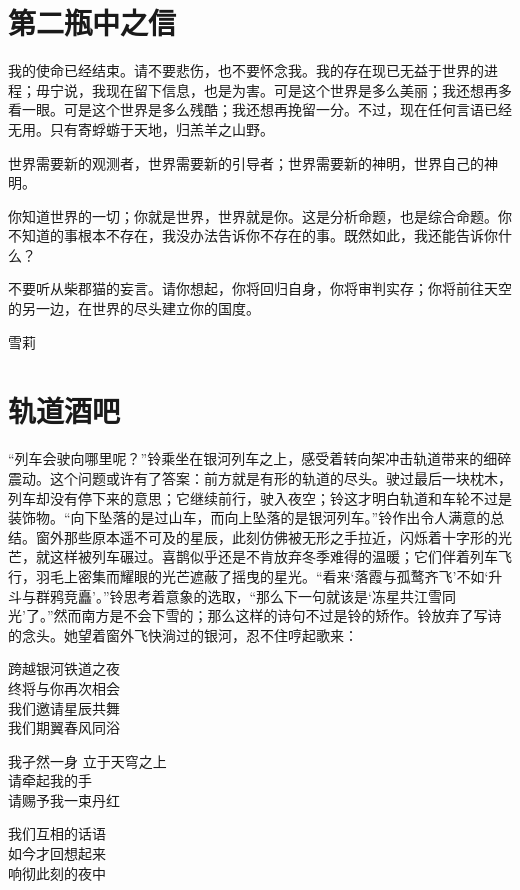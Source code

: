 %
\chapter*{第二瓶中之信}

\begingroup\kaiti%
我的使命已经结束。请不要悲伤，也不要怀念我。我的存在现已无益于世界的进程；毋宁说，我现在留下信息，也是为害。可是这个世界是多么美丽；我还想再多看一眼。可是这个世界是多么残酷；我还想再挽留一分。不过，现在任何言语已经无用。只有寄蜉蝣于天地，归羔羊之山野。

世界需要新的观测者，世界需要新的引导者；世界需要新的神明，世界自己的神明。

你知道世界的一切；你就是世界，世界就是你。这是分析命题，也是综合命题。你不知道的事根本不存在，我没办法告诉你不存在的事。既然如此，我还能告诉你什么？

不要听从柴郡猫的妄言。请你想起，你将回归自身，你将审判实存；你将前往天空的另一边，在世界的尽头建立你的国度。

\halfline\hfill%
雪莉
\endgroup\restoregeometry

\chapter{轨道酒吧}

“列车会驶向哪里呢？”铃乘坐在银河列车之上，感受着转向架冲击轨道带来的细碎震动。这个问题或许有了答案：前方就是有形的轨道的尽头。驶过最后一块枕木，列车却没有停下来的意思；它继续前行，驶入夜空；铃这才明白轨道和车轮不过是装饰物。“向下坠落的是过山车，而向上坠落的是银河列车。”铃作出令人满意的总结。窗外那些原本遥不可及的星辰，此刻仿佛被无形之手拉近，闪烁着十字形的光芒，就这样被列车碾过。喜鹊似乎还是不肯放弃冬季难得的温暖；它们伴着列车飞行，羽毛上密集而耀眼的光芒遮蔽了摇曳的星光。“看来‘落霞与孤鹜齐飞’不如‘升斗与群鸦竞矗’。”铃思考着意象的选取，“那么下一句就该是‘冻星共江雪同光’了。”然而南方是不会下雪的；那么这样的诗句不过是铃的矫作。铃放弃了写诗的念头。她望着窗外飞快淌过的银河，忍不住哼起歌来：
\begin{song}
跨越银河铁道之夜\\
终将与你再次相会\\
我们邀请星辰共舞\\
我们期翼春风同浴\par
\halfline%
我孑然一身 立于天穹之上\\
请牵起我的手\\
请赐予我一束丹红\par
\halfline%
我们互相的话语\\
如今才回想起来\\
响彻此刻的夜中\par
\end{song}

